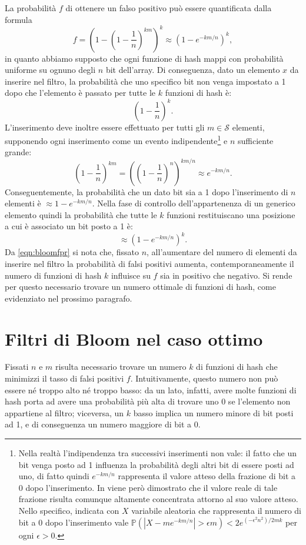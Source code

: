 \documentclass[../../main.tex]{subfiles}
\begin{document}
La probabilità $f$ di ottenere un falso positivo può essere quantificata dalla formula
\begin{equation}
    f = \left(1 - \left(1 - \frac{1}{n}\right)^{km}\right)^k \approx \left(1 - e^{-km/n}\right)^k,
    \label{eqn:bloomfpr}
\end{equation}
in quanto abbiamo supposto che ogni funzione di hash mappi con probabilità uniforme su ognuno degli $n$ bit  dell'array. Di conseguenza, dato un elemento $x$ da inserire nel filtro, la probabilità che uno specifico bit non venga impostato a 1 dopo che l'elemento è passato per tutte le $k$ funzioni di hash è:
\[\left(1 - \frac{1}{n}\right)^k.\]
L'inserimento deve inoltre essere effettuato per tutti gli $m \in \mathcal{S}$ elementi, supponendo ogni inserimento come un evento indipendente\footnote{Nella realtà l'indipendenza tra successivi inserimenti non vale: il fatto che un bit venga posto ad 1 influenza la probabilità degli altri bit di essere posti ad uno, di fatto quindi $e^{-km/n}$ rappresenta il valore atteso della frazione di bit a 0 dopo l'inserimento. In \cite{10.1145/383962.384004} viene però dimostrato che il valore reale di tale frazione risulta comunque altamente concentrata attorno al suo valore atteso. Nello specifico, indicata con $X$ variabile aleatoria che rappresenta il numero di bit a 0 dopo l'inserimento vale $\mathbb{P}\left(|X - m e^{-km/n}| > \epsilon m \right) < 2e^{(-\epsilon^2 n^2)/2mk}$ per ogni $\epsilon > 0$.} e $n$ sufficiente grande:
\[\left(1 - \frac{1}{n}\right)^{km} = \left(\left(1 - \frac{1}{n}\right)^n\right)^{km/n} \approx e^{-km/n}.\]
Conseguentemente, la probabilità che un dato bit sia a 1 dopo l'inserimento di $n$ elementi è $\approx 1 - e^{-km/n}$. Nella fase di controllo dell'appartenenza di un generico elemento quindi la probabilità che tutte le $k$ funzioni restituiscano una posizione a cui è associato un bit posto a 1 è:
\[\approx \left(1 - e^{-km/n}\right)^k.\]
Da \eqref{eqn:bloomfpr} si nota che, fissato $n$, all'aumentare del numero di elementi da inserire nel filtro la probabilità di falsi positivi aumenta, contemporaneamente il numero di funzioni di hash $k$ influisce su $f$ sia in positivo che negativo. Si rende per questo necessario trovare un numero ottimale di funzioni di hash, come evidenziato nel prossimo paragrafo.

\section{Filtri di Bloom nel caso ottimo}
Fissati $n$ e $m$ risulta necessario trovare un numero $k$ di funzioni di hash che minimizzi il tasso di falsi positivi $f$. Intuitivamente, questo numero non può essere né troppo alto né troppo basso: da un lato, infatti, avere molte funzioni di hash porta ad avere una probabilità più alta di trovare uno 0 se l'elemento non appartiene al filtro; viceversa, un $k$ basso implica un numero minore di bit posti ad 1, e di conseguenza un numero maggiore di bit a 0. 
\end{document}
